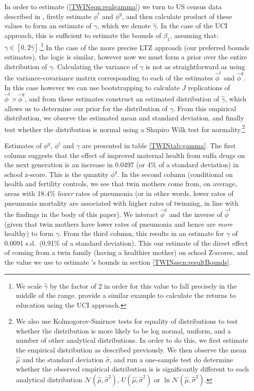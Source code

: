 In order to estimate (\ref{TWINeqn:realgamma}) we turn to US census data 
described in \citet{BhalotraVenkataramani2014}, firstly estimate $\phi^t$ and 
$\phi^q$, and then calculate product of these values to form an estimate of 
$\gamma$, which we denote $\hat\gamma$.  In the case of the UCI approach, this 
is sufficient to estimate the bounds of $\beta_1$, assuming that: 
$\gamma\in[0,2\hat\gamma]$.\footnote{We scale $\hat\gamma$ by the factor of 2 in 
order for this value to fall precisely in the middle of the range. 
\citet{Conleyetal2012} provide a similar example to calculate the returns to 
education using the UCI approach.} In the case of the more precise LTZ approach 
(our preferred bounds estimates), the logic is similar, however now we must form 
a prior over the entire distribution of $\gamma$.  Calculating the variance of 
$\gamma$ is not as straightforward as using the variance-covariance matrix 
corresponding to each of the estimates $\hat\phi^t$ and $\hat\phi^q$.  In this 
case however we can use bootstrapping to calculate $J$ replications of 
$\hat\phi^t\times\hat\phi^q$, and from these estimates construct an estimated 
distribution of $\hat\gamma$, which allows us to determine our prior for the 
distribution of $\gamma$.  From this empirical distribution, we observe the 
estimated mean and standard deviation, and finally test whether the distribution 
is normal using a Shapiro Wilk test for normality.\footnote{We also use 
Kolmogorov-Smirnov tests for equality of distributions to test whether the 
distribution is more likely to be log normal, uniform, and a number of other
analytical distributions. In order to do this, we first estimate the empirical 
distribution as described previously.  We then observe the mean $\hat\mu$ and 
the standard deviation $\hat\sigma$, and run a one-sample test do determine 
whether the observed empirical distribution is is significantly different to 
each analytical distribution $\mathcal{N}(\hat\mu,\hat\sigma^2)$, 
$U(\hat\mu,\hat\sigma^2)$ or $\ln\mathcal{N}(\hat\mu,\hat\sigma^2)$.}

Estimates of $\phi^q$, $\phi^t$ and $\gamma$ are presented in table 
\ref{TWINtab:gamma}.  The first column suggests that the effect of improved
maternal health from sulfa drugs on the next generation is an increase
in 0.0497 (or 4\% of a standard deviation) in school z-score.  This is the
quantity $\phi^q$.  In the second column (conditional on health and fertility
controls, we see that twin mothers come from, on average, areas with 18.4\%
\emph{lower} rates of pneumonia (or in other words, lower rates of pneumonia
mortality are associated with higher rates of twinning, in line with the
findings in the body of this paper).  We interact $\hat\phi^q$ and the inverse
of $\hat\phi^t$ (given that twin mothers have lower rates of pneumonia and
hence are \emph{more} healthy) to form $\gamma$.  From the third column, this
results in an estimate for $\gamma$ of 0.0091 s.d.\ (0.91\% of a standard
deviation).  This our estimate of the direct effect of coming from a twin
family (having a healthier mother) on school Z-scores, and the value we use
to estimate \citet{Conleyetal2012}'s bounds in section 
\ref{TWINsscn:resultBounds}.

